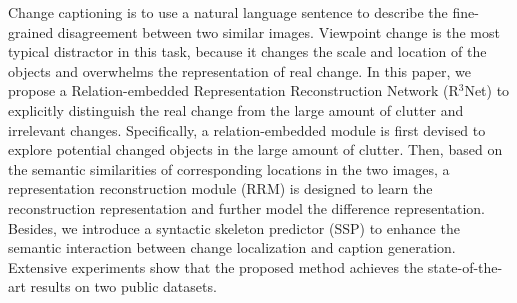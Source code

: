 Change captioning is to use a natural language sentence to describe the fine-grained disagreement between two similar images. Viewpoint change is the most typical distractor in this task, because it changes the scale and location of the objects and overwhelms the representation of real change. In this paper, we propose a Relation-embedded Representation Reconstruction Network (R$^3$Net) to explicitly distinguish the real change from the large amount of clutter and irrelevant changes. Specifically, a relation-embedded module is first devised to explore potential changed objects in the large amount of clutter. Then, based on the semantic similarities of corresponding locations in the two images, a representation reconstruction module (RRM) is designed to learn the reconstruction representation and further model the difference representation. Besides, we introduce a syntactic skeleton predictor (SSP) to enhance the semantic interaction between change localization and caption generation. Extensive experiments show that the proposed method achieves the state-of-the-art results on two public datasets.
